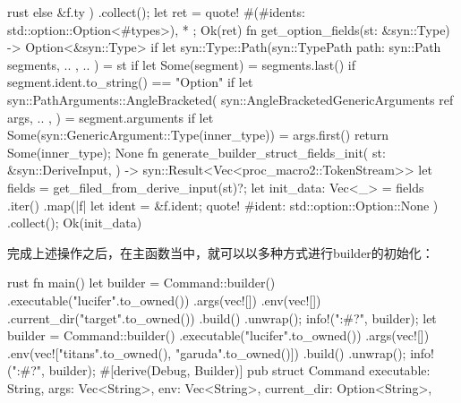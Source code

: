 \begin{code-block}{rust}
{{{            } else {
                &f.ty
            }
        })
        .collect();
    let ret = quote! {
        #(#idents: std::option::Option<#types>), *
    };
    Ok(ret)
}
fn get_option_fields(st: &syn::Type) -> Option<&syn::Type> {
    if let syn::Type::Path(syn::TypePath {
        path: syn::Path { segments, .. },
        ..
    }) = st
    {
        if let Some(segment) = segments.last() {
            if segment.ident.to_string() == "Option" {
                {
                    if let syn::PathArguments::AngleBracketed(
                        syn::AngleBracketedGenericArguments { ref args, .. },
                    ) = segment.arguments
                    {
                        if let Some(syn::GenericArgument::Type(inner_type)) = args.first() {
                            return Some(inner_type);
                        }
                    }
                }
            }
        }
    }
    None
}
fn generate_builder_struct_fields_init(
    st: &syn::DeriveInput,
) -> syn::Result<Vec<proc_macro2::TokenStream>> {
    let fields = get_filed_from_derive_input(st)?;
    let init_data: Vec<_> = fields
        .iter()
        .map(|f| {
            let ident = &f.ident;
            quote! {
                #ident: std::option::Option::None
            }
        })
        .collect();
    Ok(init_data)
}
\end{code-block}

完成上述操作之后，在主函数当中，就可以以多种方式进行builder的初始化：
\begin{code-block}{rust}
fn main(){
    let builder = Command::builder()
        .executable("lucifer".to_owned())
        .args(vec![])
        .env(vec![])
        .current_dir("target".to_owned())
        .build()
        .unwrap();
    info!("{:#?}", builder);
    let builder = Command::builder()
        .executable("lucifer".to_owned())
        .args(vec![])
        .env(vec!["titans".to_owned(), "garuda".to_owned()])
        .build()
        .unwrap();
    info!("{:#?}", builder);
}
#[derive(Debug, Builder)]
pub struct Command {
    executable: String,
    args: Vec<String>,
    env: Vec<String>,
    current_dir: Option<String>,
}
\end{code-block}

